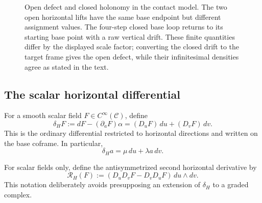\begin{figure}[t]
\caption{Open defect and closed holonomy in the contact model.  The two open
horizontal lifts have the same base endpoint but different assignment values.
The four-step closed base loop returns to its starting base point with a raw
vertical drift.  These finite quantities differ by the displayed scale factor;
converting the closed drift to the target frame gives the open defect, while
their infinitesimal densities agree as stated in the text.}
\label{fig:contact-open-closed-commutator}
\end{figure}

\subsection{The scalar horizontal differential}

For a smooth scalar field \(F\in C^\infty(\mathcal C)\), define
\begin{equation}
    \delta_HF
       :=dF-(\partial_aF)\alpha
       =(D_uF)\,du+(D_vF)\,dv.
    \label{eq:scalar-horizontal-differential}
\end{equation}
This is the ordinary differential restricted to horizontal directions and
written on the base coframe.  In particular,
\[
    \delta_Ha=\mu\,du+\lambda a\,dv.
\]

For scalar fields only, define the antisymmetrized second horizontal derivative
by
\begin{equation}
    \mathcal R_H(F)
      :=(D_uD_vF-D_vD_uF)\,du\wedge dv.
    \label{eq:horizontal-scalar-curvature-definition}
\end{equation}
This notation deliberately avoids presupposing an extension of \(\delta_H\) to
a graded complex.

